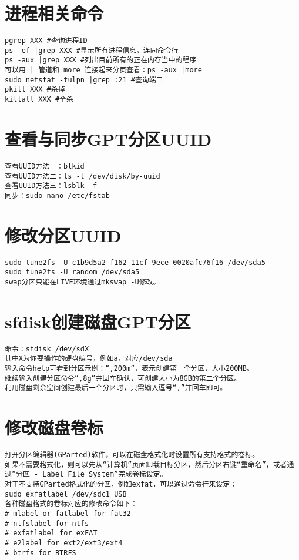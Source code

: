 \documentclass[a4paper,fontset=fandol,zihao=-4,linespread=1.2,oneside]{ctexbook}
\begin{document}
\section{进程相关命令}
\begin{lstlisting}
pgrep XXX #查询进程ID
ps -ef |grep XXX #显示所有进程信息，连同命令行
ps -aux |grep XXX #列出目前所有的正在内存当中的程序
可以用 | 管道和 more 连接起来分页查看：ps -aux |more
sudo netstat -tulpn |grep :21 #查询端口
pkill XXX #杀掉
killall XXX #全杀
\end{lstlisting}

\section{查看与同步GPT分区UUID}
\begin{lstlisting}
查看UUID方法一：blkid
查看UUID方法二：ls -l /dev/disk/by-uuid
查看UUID方法三：lsblk -f
同步：sudo nano /etc/fstab
\end{lstlisting}

\section{修改分区UUID}
\begin{lstlisting}
sudo tune2fs -U c1b9d5a2-f162-11cf-9ece-0020afc76f16 /dev/sda5
sudo tune2fs -U random /dev/sda5
swap分区只能在LIVE环境通过mkswap -U修改。
\end{lstlisting}

\section{sfdisk创建磁盘GPT分区}
\begin{lstlisting}
命令：sfdisk /dev/sdX
其中X为你要操作的硬盘编号，例如a，对应/dev/sda
输入命令help可看到分区示例：“,200m”，表示创建第一个分区，大小200MB。
继续输入创建分区命令“,8g”并回车确认，可创建大小为8GB的第二个分区。
利用磁盘剩余空间创建最后一个分区时，只需输入逗号“,”并回车即可。
\end{lstlisting}

\section{修改磁盘卷标}
\begin{lstlisting}
打开分区编辑器(GParted)软件，可以在磁盘格式化时设置所有支持格式的卷标。
如果不需要格式化，则可以先从“计算机”页面卸载目标分区，然后分区右键“重命名”，或者通过“分区 - Label File System”完成卷标设定。
对于不支持GParted格式化的分区，例如exfat，可以通过命令行来设定：
sudo exfatlabel /dev/sdc1 USB
各种磁盘格式的卷标对应的修改命令如下：
# mlabel or fatlabel for fat32
# ntfslabel for ntfs
# exfatlabel for exFAT
# e2label for ext2/ext3/ext4
# btrfs for BTRFS
\end{lstlisting}
\end{document}
